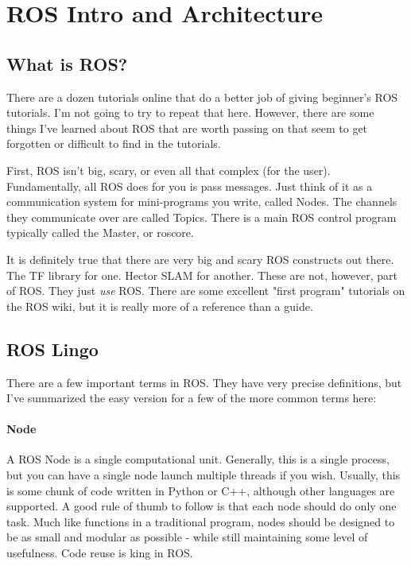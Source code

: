 
\chapter{ROS Intro and Architecture}
\label{chap:rosarchitecture}

\section{What is ROS?}

There are a dozen tutorials online that do a better job of giving beginner's ROS tutorials. I'm not going to try to repeat that here. However, there are some things I've learned about ROS that are worth passing on that seem to get forgotten or difficult to find in the tutorials.

First, ROS isn't big, scary, or even all that complex (for the user). Fundamentally, all ROS does for you is pass messages. Just think of it as a communication system for mini-programs you write, called Nodes. The channels they communicate over are called Topics. There is a main ROS control program typically called the Master, or roscore.

It is definitely true that there are very big and scary ROS constructs out there. The TF library for one. Hector SLAM for another. These are not, however, part of ROS. They just \textit{use} ROS. There are some excellent "first program" tutorials on the ROS wiki, but it is really more of a reference than a guide.

\section{ROS Lingo}

There are a few important terms in ROS. They have very precise definitions, but I've summarized the easy version for a few of the more common terms here:

\subsubsection{Node}

A ROS Node is a single computational unit. Generally, this is a single process, but you can have a single node launch multiple threads if you wish. Usually, this is some chunk of code written in Python or C++, although other languages are supported. A good rule of thumb to follow is that each node should do only one task. Much like functions in a traditional program, nodes should be designed to be as small and modular as possible - while still maintaining some level of usefulness. Code reuse is king in ROS.

